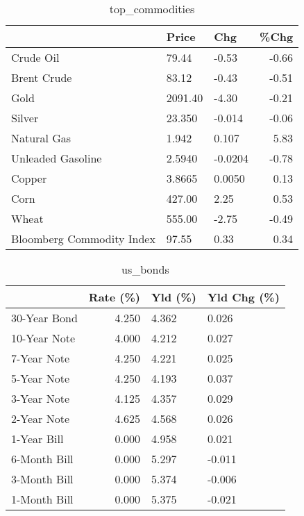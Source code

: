 \documentclass{article}%
\begin{document}
\begin{table}[htbp]%
\caption{top\_commodities}%
\centering%
\begin{adjustbox}{width=1\textwidth}%
\begin{tabular}{lllr}
\toprule
                          &   Price &     Chg &  \%Chg \\
\midrule
               Crude Oil  &   79.44 &   -0.53 & -0.66 \\
             Brent Crude  &   83.12 &   -0.43 & -0.51 \\
                    Gold  & 2091.40 &   -4.30 & -0.21 \\
                  Silver  &  23.350 &  -0.014 & -0.06 \\
             Natural Gas  &   1.942 &   0.107 &  5.83 \\
       Unleaded Gasoline  &  2.5940 & -0.0204 & -0.78 \\
                  Copper  &  3.8665 &  0.0050 &  0.13 \\
                    Corn  &  427.00 &    2.25 &  0.53 \\
                   Wheat  &  555.00 &   -2.75 & -0.49 \\
Bloomberg Commodity Index &   97.55 &    0.33 &  0.34 \\
\bottomrule
\end{tabular}
%
\end{adjustbox}%
\end{table}

%


\begin{table}[htbp]%
\caption{us\_bonds}%
\centering%
\begin{adjustbox}{width=1\textwidth}%
\begin{tabular}{lrll}
\toprule
             &  Rate (\%) & Yld (\%) & Yld Chg (\%) \\
\midrule
30-Year Bond &     4.250 &   4.362 &       0.026 \\
10-Year Note &     4.000 &   4.212 &       0.027 \\
 7-Year Note &     4.250 &   4.221 &       0.025 \\
 5-Year Note &     4.250 &   4.193 &       0.037 \\
 3-Year Note &     4.125 &   4.357 &       0.029 \\
 2-Year Note &     4.625 &   4.568 &       0.026 \\
 1-Year Bill &     0.000 &   4.958 &       0.021 \\
6-Month Bill &     0.000 &   5.297 &      -0.011 \\
3-Month Bill &     0.000 &   5.374 &      -0.006 \\
1-Month Bill &     0.000 &   5.375 &      -0.021 \\
\bottomrule
\end{tabular}
%
\end{adjustbox}%
\end{table}
\end{document}

